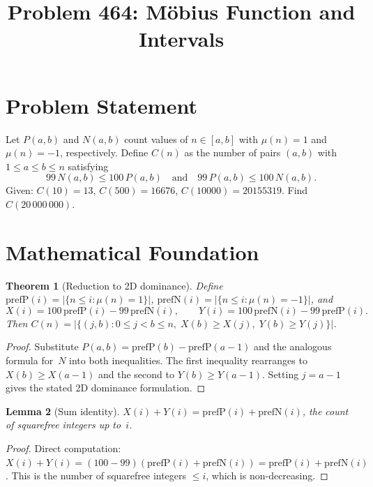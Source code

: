 \documentclass[11pt]{article}
\title{Problem 464: M\"obius Function and Intervals}
\author{}
\date{}
\newtheorem{theorem}{Theorem}
\newtheorem{lemma}[theorem]{Lemma}
\begin{document}
\maketitle

\section{Problem Statement}

Let $P(a,b)$ and $N(a,b)$ count values of $n \in [a,b]$ with $\mu(n) = 1$ and $\mu(n) = -1$, respectively. Define $C(n)$ as the number of pairs $(a,b)$ with $1 \le a \le b \le n$ satisfying
\[
99\,N(a,b) \le 100\,P(a,b) \quad\text{and}\quad 99\,P(a,b) \le 100\,N(a,b).
\]
Given: $C(10) = 13$, $C(500) = 16676$, $C(10000) = 20155319$. Find $C(20\,000\,000)$.

\section{Mathematical Foundation}

\begin{theorem}[Reduction to 2D dominance]
\label{thm:dom}
Define $\mathrm{prefP}(i) = |\{n \le i : \mu(n) = 1\}|$, $\mathrm{prefN}(i) = |\{n \le i : \mu(n) = -1\}|$, and
\[
X(i) = 100\,\mathrm{prefP}(i) - 99\,\mathrm{prefN}(i), \qquad Y(i) = 100\,\mathrm{prefN}(i) - 99\,\mathrm{prefP}(i).
\]
Then $C(n) = |\{(j, b) : 0 \le j < b \le n,\; X(b) \ge X(j),\; Y(b) \ge Y(j)\}|$.
\end{theorem}

\begin{proof}
Substitute $P(a,b) = \mathrm{prefP}(b) - \mathrm{prefP}(a-1)$ and the analogous formula for~$N$ into both inequalities. The first inequality rearranges to $X(b) \ge X(a-1)$ and the second to $Y(b) \ge Y(a-1)$. Setting $j = a - 1$ gives the stated 2D dominance formulation.
\end{proof}

\begin{lemma}[Sum identity]
\label{lem:sum}
$X(i) + Y(i) = \mathrm{prefP}(i) + \mathrm{prefN}(i)$, the count of squarefree integers up to~$i$.
\end{lemma}

\begin{proof}
Direct computation: $X(i) + Y(i) = (100 - 99)(\mathrm{prefP}(i) + \mathrm{prefN}(i)) = \mathrm{prefP}(i) + \mathrm{prefN}(i)$. This is the number of squarefree integers $\le i$, which is non-decreasing.
\end{proof}
\end{document}
